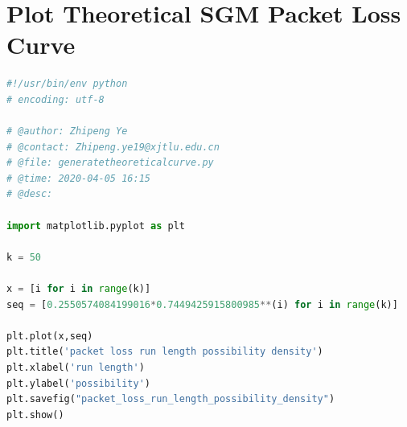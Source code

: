 \documentclass[11pt]{article}
\begin{document}
\section{Plot Theoretical SGM Packet Loss Curve}\label{TSPLC}
\begin{lstlisting}[language=Python]
#!/usr/bin/env python
# encoding: utf-8

# @author: Zhipeng Ye
# @contact: Zhipeng.ye19@xjtlu.edu.cn
# @file: generatetheoreticalcurve.py
# @time: 2020-04-05 16:15
# @desc:

import matplotlib.pyplot as plt

k = 50

x = [i for i in range(k)]
seq = [0.2550574084199016*0.7449425915800985**(i) for i in range(k)]

plt.plot(x,seq)
plt.title('packet loss run length possibility density')
plt.xlabel('run length')
plt.ylabel('possibility')
plt.savefig("packet_loss_run_length_possibility_density")
plt.show()

\end{lstlisting}
\end{document}
